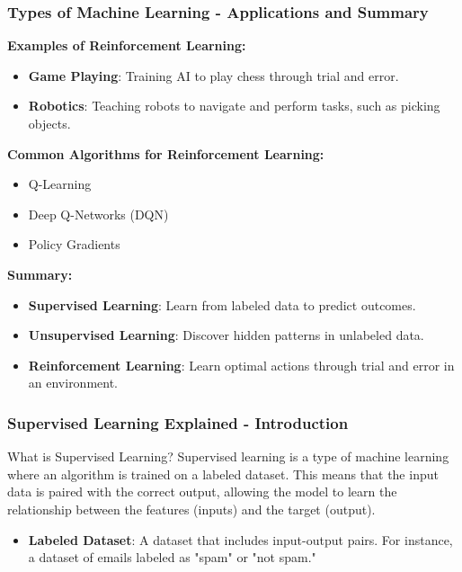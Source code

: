 \documentclass[aspectratio=169]{beamer}
\begin{document}
\begin{frame}[fragile]
    \frametitle{Types of Machine Learning - Applications and Summary}
    \textbf{Examples of Reinforcement Learning:}
    \begin{itemize}
        \item \textbf{Game Playing}: Training AI to play chess through trial and error.
        \item \textbf{Robotics}: Teaching robots to navigate and perform tasks, such as picking objects.
    \end{itemize}

    \textbf{Common Algorithms for Reinforcement Learning:}
    \begin{itemize}
        \item Q-Learning
        \item Deep Q-Networks (DQN)
        \item Policy Gradients
    \end{itemize}

    \textbf{Summary:}
    \begin{itemize}
        \item \textbf{Supervised Learning}: Learn from labeled data to predict outcomes.
        \item \textbf{Unsupervised Learning}: Discover hidden patterns in unlabeled data.
        \item \textbf{Reinforcement Learning}: Learn optimal actions through trial and error in an environment.
    \end{itemize}
\end{frame}

\begin{frame}[fragile]
    \frametitle{Supervised Learning Explained - Introduction}
    \begin{block}{What is Supervised Learning?}
        Supervised learning is a type of machine learning where an algorithm is trained on a labeled dataset. This means that the input data is paired with the correct output, allowing the model to learn the relationship between the features (inputs) and the target (output).
    \end{block}
    \begin{itemize}
        \item \textbf{Labeled Dataset}: A dataset that includes input-output pairs. For instance, a dataset of emails labeled as "spam" or "not spam."
    \end{itemize}
\end{frame}
\end{document}
